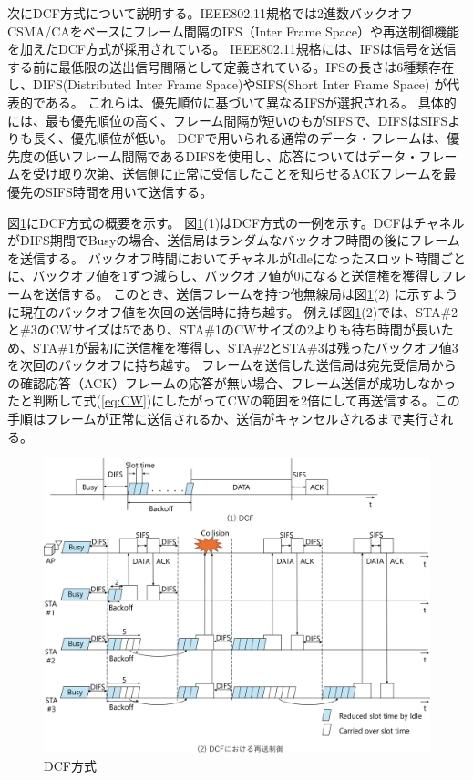 \documentclass[a4paper,10.5pt]{ltjsarticle}
\begin{document}
次にDCF方式について説明する。IEEE802.11規格では2進数バックオフCSMA/CAをベースにフレーム間隔のIFS（Inter Frame Space）や再送制御機能を加えたDCF方式が採用されている。
IEEE802.11規格には、IFSは信号を送信する前に最低限の送出信号間隔として定義されている。IFSの長さは6種類存在し、DIFS(Distributed Inter Frame Space)やSIFS(Short Inter Frame Space) が代表的である。
これらは、優先順位に基づいて異なるIFSが選択される。
具体的には、最も優先順位の高く、フレーム間隔が短いのもがSIFSで、DIFSはSIFSよりも長く、優先順位が低い。
DCFで用いられる通常のデータ・フレームは、優先度の低いフレーム間隔であるDIFSを使用し、応答についてはデータ・フレームを受け取り次第、送信側に正常に受信したことを知らせるACKフレームを最優先のSIFS時間を用いて送信する。

図\ref{fig:DCF}にDCF方式の概要を示す。
図\ref{fig:DCF}(1)はDCF方式の一例を示す。DCFはチャネルがDIFS期間でBusyの場合、送信局はランダムなバックオフ時間の後にフレームを送信する。
バックオフ時間においてチャネルがIdleになったスロット時間ごとに、バックオフ値を1ずつ減らし、バックオフ値が0になると送信権を獲得しフレームを送信する。
このとき、送信フレームを持つ他無線局は図\ref{fig:DCF}(2) に示すように現在のバックオフ値を次回の送信時に持ち越す。
例えば図\ref{fig:DCF}(2)では、STA\#2と\#3の$\mathrm{CW}$サイズは5であり、STA\#1の$\mathrm{CW}$サイズの2よりも待ち時間が長いため、STA\#1が最初に送信権を獲得し、STA\#2とSTA\#3は残ったバックオフ値3を次回のバックオフに持ち越す。
フレームを送信した送信局は宛先受信局からの確認応答（ACK）フレームの応答が無い場合、フレーム送信が成功しなかったと判断して式(\ref{eq:CW})にしたがって$\mathrm{CW}$の範囲を2倍にして再送信する。この手順はフレームが正常に送信されるか、送信がキャンセルされるまで実行される。

\begin{figure}[p]
  \centering
  \includegraphics[width=\linewidth]{DCF.pdf} %
  \caption{DCF方式}
  \label{fig:DCF} %
\end{figure}
\clearpage
\end{document}
